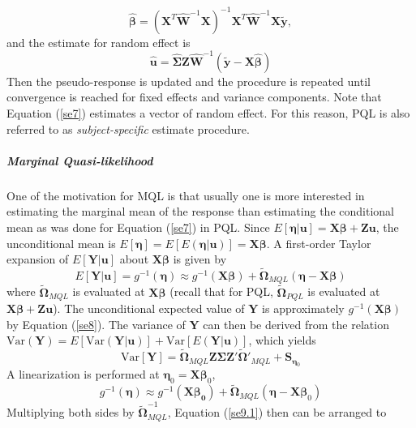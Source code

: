 		\begin{equation}
		\hat{\bm\beta} = (\bm X^T\hat{\bm W}^{-1} \bm X)^{-1}\bm X^T\hat{\bm W}^{-1}\bm X \tilde{\bm y},
		\end{equation}
		and the estimate for random effect is 
		\begin{equation}\label{se7}
		\hat{\bm u} = \hat{\bm\Sigma } \bm Z \hat{\bm W}^{-1} (\tilde{\bm y}-\bm {X} \hat{\bm \beta})
		\end{equation}
		Then the pseudo-response is updated and the procedure is repeated until convergence is reached for fixed effects and variance components.  Note that Equation (\ref{se7}) estimates a vector of random effect. For this reason, PQL is also referred to as \textit{subject-specific} estimate procedure. 
		
		\subparagraph*{Marginal Quasi-likelihood} 
		One of the motivation for MQL is that usually one is more interested in estimating the marginal mean of the response than estimating the conditional mean as was done for Equation (\ref{se7}) in PQL. Since $E[\bm \eta|\bm u]= \bm {X\beta} + \bm {Zu}$, the unconditional mean is $E[\bm \eta] = E[E(\bm \eta|\bm u)]= \bm {X\beta}$. A first-order Taylor expansion of $E[\bm Y|\bm u]$ about $\bm X \bm\beta$ is given by 
		\begin{equation}\label{se8}
		E[\bm Y|\bm u] = g^{-1}(\bm \eta) \approx g^{-1} (\bm{X\beta}) + \tilde{\bm \Omega}_{MQL} (\bm \eta - \bm X\bm \beta)
		\end{equation}
		where $\tilde{\bm \Omega}_{MQL}$ is evaluated at $\bm {X\beta}$ (recall that for PQL, $\tilde{\bm \Omega}_{PQL}$ is evaluated at $\bm {X\beta} + \bm {Zu}$). The unconditional expected value of  $\bm Y$ is approximately $g^{-1}(\bm {X\beta})$ by Equation (\ref{se8}). The variance of $\bm Y$ can then be derived from the relation $\text{Var}(\bm Y)= E[\text{Var}(\bm Y|\bm u)] + \text{Var}[E(\bm Y| \bm u)]$, which yields
		\begin{equation}\label{se9}
		\text{Var}[\bm Y] = \tilde{\bm \Omega}_{MQL} \bm {Z\Sigma Z'}\tilde{\bm \Omega}'_{MQL} + \bm S_{\bm \eta_0}
		\end{equation}
		A linearization is performed at $\bm \eta_0= \bm X \bm \beta_0$, 
		\begin{equation}\label{se9.1}
		 g^{-1}(\bm \eta) \approx g^{-1} (\bm{X\beta_0}) + \tilde{\bm \Omega}_{MQL} (\bm \eta - \bm X\bm \beta_0)
		\end{equation}
		Multiplying both sides by $\tilde{\bm \Omega}_{MQL} ^{-1}$, Equation (\ref{se9.1}) then can be arranged to 
